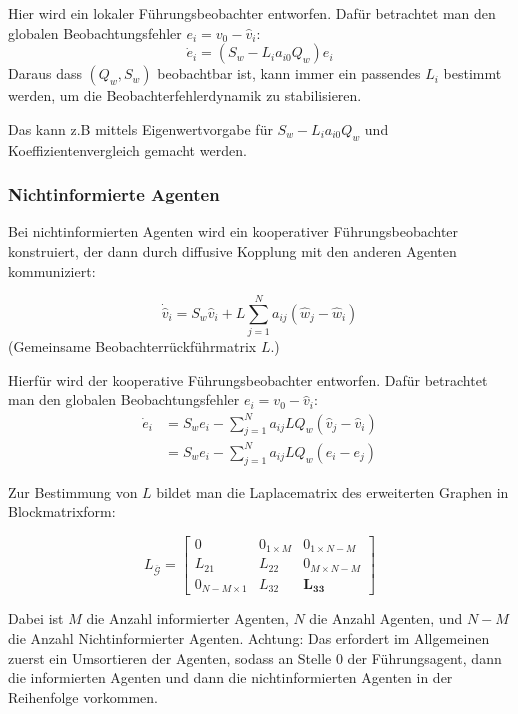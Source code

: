Hier wird ein lokaler Führungsbeobachter entworfen.
Dafür betrachtet man den globalen Beobachtungsfehler $e_i = v_0 - \hat{v}_i$:
\begin{equation}
    \dot{e}_i = (S_w - L_i a_{i0} Q_w) e_i
\end{equation}
Daraus dass $(Q_w, S_w)$ beobachtbar ist, kann immer ein passendes $L_i$ bestimmt werden,
um die Beobachterfehlerdynamik zu stabilisieren.

Das kann z.B mittels Eigenwertvorgabe für $S_w - L_i a_{i0} Q_w$ und
Koeffizientenvergleich gemacht werden.

\subsubsection{Nichtinformierte Agenten}

Bei nichtinformierten Agenten wird ein kooperativer Führungsbeobachter konstruiert,
der dann durch diffusive Kopplung mit den anderen Agenten kommuniziert:

\begin{equation}
    \dot{\hat{v}}_i = S_w \hat{v}_i + L \sum_{j=1}^N a_{ij} (\hat{w}_j - \hat{w}_i)
\end{equation}
(Gemeinsame Beobachterrückführmatrix $L$.)

Hierfür wird der kooperative Führungsbeobachter entworfen.
Dafür betrachtet man den globalen Beobachtungsfehler $e_i = v_0 - \hat{v}_i$:
\begin{align}
    \dot{e}_i &= S_w e_i - \sum_{j=1}^N a_{ij} L Q_w (\hat{v}_j - \hat{v}_i) \\
    &= S_w e_i - \sum_{j=1}^N a_{ij} L Q_w (e_i - e_j)
\end{align}

Zur Bestimmung von $L$ bildet man die Laplacematrix des erweiterten Graphen in Blockmatrixform:

\begin{equation}
    L_{\overbar{\mathcal{G}}} = \begin{bmatrix}
        0 & 0_{1\times M} & 0_{1 \times N-M}\\
        L_{21} & L_{22} & 0_{M \times N-M} \\
        0_{N-M \times 1} & L_{32} & \bm{L_{33}}
    \end{bmatrix}
\end{equation}

Dabei ist $M$ die Anzahl informierter Agenten, $N$ die Anzahl Agenten, und $N-M$ die
Anzahl Nichtinformierter Agenten.
Achtung: Das erfordert im Allgemeinen zuerst ein Umsortieren der Agenten, sodass
an Stelle 0 der Führungsagent, dann die informierten Agenten und dann die
nichtinformierten Agenten in der Reihenfolge vorkommen.


